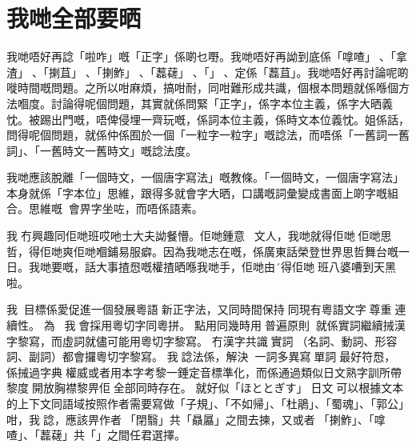 



\section{我哋全部要晒}
我哋唔好再諗「啦咋」嘅「正字」係啲乜嘢。我哋唔好再詏到底係「嗱喳」󱔖、「拿渣」󱔖、「揦苴」󱔖、「揦鮓」󱔖、「藞䕢」󱔖、「」󱔖、定係「藞苴」。我哋唔好再討論呢啲嘥時間嘅問題。之所以咁麻煩，搞咁耐，同咁難形成共識，個根本問題就係喺個方法嗰度。討論得呢個問題，其實就係問緊「正字」，係字本位主義，係字大晒義忱。被踢出門嘅，唔俾侵埋一齊玩嘅，係詞本位主義，係時文本位義忱。姐係話，問得呢個問題，就係仲係囿於一個「一粒字一粒字」嘅諗法，而唔係「一舊詞一舊詞」、「一舊時文一舊時文」嘅諗法度。

我哋應該脫離「一個時文，一個唐字寫法」嘅教條。「一個時文，一個唐字寫法」本身就係「字本位」思維，跟得多就會字大晒，口講嘅詞彙變成書面上啲字嘅組合。思維嘅會畀字坐咗，而唔係語素。


我冇興趣同佢哋班哎吔士大夫詏餐懵。佢哋鍾意文人，我哋就得佢哋佢哋思哲，得佢哋爽佢哋嗰鋪易服癖。因為我哋志在嘅，係廣東話榮登世界思哲舞台嘅一日。我哋要嘅，話大事揸𢝵嘅權揸晒喺我哋手，佢哋由´得佢哋󱐂班八婆嘈到天黑啦。

我󱝚目標係愛促進一個發展粵語󱝚新正字法，又同時間保持󱅽同現有粵語文字󱝚尊重連續性。 為󱃡󱜩，我會採用粵切字同粵拼。 點用同幾時用󱝚普遍原則󰳞，就係實詞繼續𢬿漢字黎寫，而虛詞就儘可能用粵切字黎寫。 冇漢字共識󱝚實詞󰳞（名詞、動詞、形容詞、副詞）都會攞粵切字黎寫。 我諗法係，解決󱟡一詞多異寫󱝚單詞󱝚最好符𢝵，𠄡係𢬿過字典󱝚權威或者用本字考黎一錘定音標準化，而係通過類似日文熟字訓所帶黎度󱝚開放胸襟黎畀佢全部同時存在。 就好似「ほととぎす」󱪙日文󰧵可以根據文本的上下文同語域按照作者需要寫做「子規」、「不如帰」、「杜鵑」、「蜀魂」、「郭公」咁，我諗，應該畀作者󱪙「閉翳」共「贔屭」之間去揀，又或者󱪙「揦鮓」、「嗱喳」、「藞䕢」共「」之間任君選擇。


